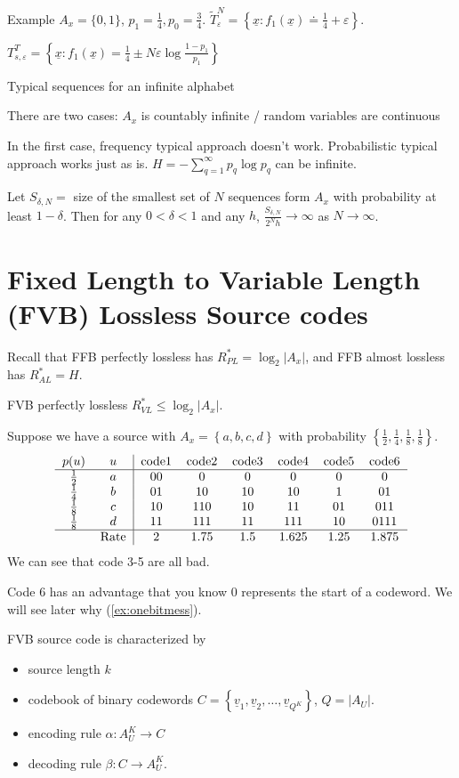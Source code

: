 \documentclass{report}
\newcommand{\set}[1]{\left\lbrace #1 \right\rbrace}
\theoremstyle{definition}
\theoremstyle{remark}
\numberwithin{equation}{section}
\begin{document}
Example $A_x = \{0, 1\}$, $p_1 = \frac{1}{4}, p_0 = \frac{3}{4}$. $\tilde{T}_\varepsilon^N = \set{\underline{x}: f_1(\underline{x}) \doteq \frac{1}{4} + \varepsilon}$.

$T_{s, \varepsilon}^T = \set{\underline{x}: f_1(\underline{x}) = \frac{1}{4} \pm N\varepsilon\log\frac{1 - p_1}{p_1}}$


Typical sequences for an infinite alphabet

There are two cases:
$A_x$ is countably infinite / random variables are continuous

In the first case, frequency typical approach doesn't work. Probabilistic typical approach works just as is. $H = -\sum_{q=1}^\infty p_q \log p_q$ can be infinite.

Let $S_{\delta, N} = $ size of the smallest set of $N$ sequences form $A_x$ with probability at least $1-\delta$. Then for any $0 < \delta < 1$ and any $h$, $\frac{S_{\delta, N}}{2^Nh} \to \infty$ as $N \to \infty$.

\section{Fixed Length to Variable Length (FVB) Lossless Source codes}

Recall that FFB perfectly lossless has $R^*_{PL} = \log_2|A_x|$, and FFB almost lossless has $R^*_{AL} = H$.

FVB perfectly lossless $R^*_{VL} \leq \log_2|A_x|$.

Suppose we have a source with $A_x = \set{a,b,c,d}$ with probability $\set{\frac{1}{2},\frac{1}{4},\frac{1}{8},\frac{1}{8}}$.
\[\begin{tabular}{cc|cccccc}
  $p(u)$ & $u$ & code1 & code2 & code3 & code4 & code5 & code6\\ \hline
  $\frac{1}{2}$ & $a$ & 00 & 0 & 0 & 0 & 0 & 0 \\ 
  $\frac{1}{4}$ & $b$ & 01 & 10 & 10 & 10 & 1 & 01 \\ 
  $\frac{1}{8}$ & $c$ & 10 & 110 & 10 & 11 & 01 & 011\\
  $\frac{1}{8}$ & $d$ & 11 & 111& 11 & 111 & 10 & 0111\\ \hline
  & Rate & 2 & 1.75 & 1.5 & 1.625 & 1.25 & 1.875
\end{tabular}\]
We can see that code 3-5 are all bad.

Code 6 has an advantage that you know 0 represents the start of a codeword. We will see later why (\autoref{ex:onebitmess}).

FVB source code is characterized by \begin{itemize}
  \item source length $k$
  \item codebook of binary codewords $C = \set{\underline{v}_1, \underline{v}_2, \ldots, \underline{v}_{Q^K}}$, $Q = |A_U|$.
  \item encoding rule $\alpha: A_U^K \to C$
  \item decoding rule $\beta: C \to A_U^K$.
\end{itemize}
\end{document}
